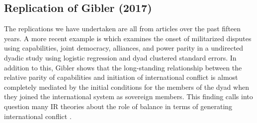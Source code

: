 \subsection{Replication of Gibler (2017)}


The replications we have undertaken are all from articles over the past fifteen years.  A more recent example is \citet{gibler:2017} which examines the onset of militarized disputes using capabilities, joint democracy, alliances, and power parity in a undirected dyadic study using logistic regression and dyad clustered standard errors.   In addition to this, Gibler shows that the long-standing relationship between the relative parity of capabilities and initiation of international conflict is almost completely mediated by the initial conditions for the members of the dyad when they joined the international system as sovereign members. This finding calls into question many IR theories about the role of balance in terms of generating international conflict \citep{organski:1958}.

